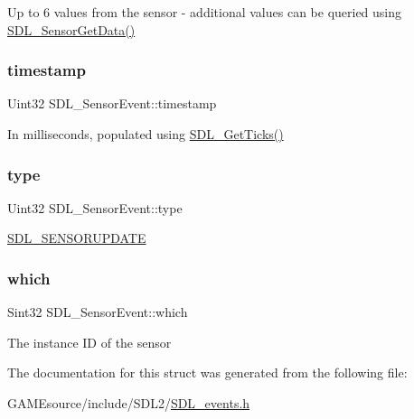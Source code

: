 Up to 6 values from the sensor -\/ additional values can be queried using \mbox{\hyperlink{_s_d_l__sensor_8h_a22466ee6b7af791937ebf1f7b76ed56b}{S\+D\+L\+\_\+\+Sensor\+Get\+Data()}} \mbox{\label{struct_s_d_l___sensor_event_a7de6c2b4d4791f5553b5de225293ceb5}} 
\subsubsection{\texorpdfstring{timestamp}{timestamp}}
{\footnotesize\ttfamily Uint32 S\+D\+L\+\_\+\+Sensor\+Event\+::timestamp}

In milliseconds, populated using \mbox{\hyperlink{_s_d_l__timer_8h_a0b9bc71d6287e0ffafdc3419760fe2b3}{S\+D\+L\+\_\+\+Get\+Ticks()}} \mbox{\label{struct_s_d_l___sensor_event_a0173d64fbe5299cad956298faf3fb0f9}} 
\subsubsection{\texorpdfstring{type}{type}}
{\footnotesize\ttfamily Uint32 S\+D\+L\+\_\+\+Sensor\+Event\+::type}

\mbox{\hyperlink{_s_d_l__events_8h_a3b589e89be6b35c02e0dd34a55f3fccaa1536ed6dfb1cdb20da84b7e2c602c022}{S\+D\+L\+\_\+\+S\+E\+N\+S\+O\+R\+U\+P\+D\+A\+TE}} \mbox{\label{struct_s_d_l___sensor_event_aa1c130192bad9b316f811f2d138b3b22}} 
\subsubsection{\texorpdfstring{which}{which}}
{\footnotesize\ttfamily Sint32 S\+D\+L\+\_\+\+Sensor\+Event\+::which}

The instance ID of the sensor 

The documentation for this struct was generated from the following file\+:\begin{DoxyCompactItemize}
\item 
G\+A\+M\+Esource/include/\+S\+D\+L2/\mbox{\hyperlink{_s_d_l__events_8h}{S\+D\+L\+\_\+events.\+h}}\end{DoxyCompactItemize}
